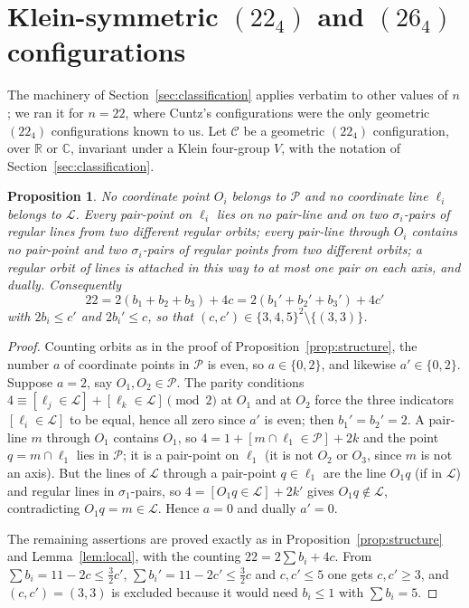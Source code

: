 \documentclass[11pt]{article}
\theoremstyle{plain}
\newtheorem{proposition}[theorem]{Proposition}
\theoremstyle{definition}
\newcommand{\RR}{\mathbb{R}}
\newcommand{\CC}{\mathbb{C}}
\newcommand{\cP}{\mathcal{P}}
\newcommand{\cL}{\mathcal{L}}
\newcommand{\cC}{\mathcal{C}}
\begin{document}
\section{Klein-symmetric $(22_4)$ and $(26_4)$ configurations}\label{sec:22}

The machinery of Section~\ref{sec:classification} applies verbatim to other values of $n$; we ran it for $n=22$, where Cuntz's configurations \cite{Cun18} were the only geometric $(22_4)$ configurations known to us.  Let $\cC$ be a geometric $(22_4)$ configuration, over $\RR$ or $\CC$, invariant under a Klein four-group $V$, with the notation of Section~\ref{sec:classification}.

\begin{proposition}\label{prop:22structure}
No coordinate point $O_i$ belongs to $\cP$ and no coordinate line $\ell_i$ belongs to $\cL$.  Every pair-point on $\ell_i$ lies on no pair-line and on two $\sigma_i$-pairs of regular lines from two different regular orbits; every pair-line through $O_i$ contains no pair-point and two $\sigma_i$-pairs of regular points from two different orbits; a regular orbit of lines is attached in this way to at most one pair on each axis, and dually.  Consequently
\[
22=2(b_1+b_2+b_3)+4c=2(b_1'+b_2'+b_3')+4c'
\]
with $2b_i\le c'$ and $2b_i'\le c$, so that $(c,c')\in\{3,4,5\}^2\setminus\{(3,3)\}$.
\end{proposition}

\begin{proof}
Counting orbits as in the proof of Proposition~\ref{prop:structure}, the number $a$ of coordinate points in $\cP$ is even, so $a\in\{0,2\}$, and likewise $a'\in\{0,2\}$.  Suppose $a=2$, say $O_1,O_2\in\cP$.  The parity conditions $4\equiv[\ell_j\in\cL]+[\ell_k\in\cL]\pmod2$ at $O_1$ and at $O_2$ force the three indicators $[\ell_i\in\cL]$ to be equal, hence all zero since $a'$ is even; then $b_1'=b_2'=2$.  A pair-line $m$ through $O_1$ contains $O_1$, so $4=1+[m\cap\ell_1\in\cP]+2k$ and the point $q=m\cap\ell_1$ lies in $\cP$; it is a pair-point on $\ell_1$ (it is not $O_2$ or $O_3$, since $m$ is not an axis).  But the lines of $\cL$ through a pair-point $q\in\ell_1$ are the line $O_1q$ (if in $\cL$) and regular lines in $\sigma_1$-pairs, so $4=[O_1q\in\cL]+2k'$ gives $O_1q\notin\cL$, contradicting $O_1q=m\in\cL$.  Hence $a=0$ and dually $a'=0$.

The remaining assertions are proved exactly as in Proposition~\ref{prop:structure} and Lemma~\ref{lem:local}, with the counting $22=2\sum b_i+4c$.  From $\sum b_i=11-2c\le\frac32c'$, $\sum b_i'=11-2c'\le\frac32c$ and $c,c'\le5$ one gets $c,c'\ge3$, and $(c,c')=(3,3)$ is excluded because it would need $b_i\le1$ with $\sum b_i=5$.
\end{proof}
\end{document}
